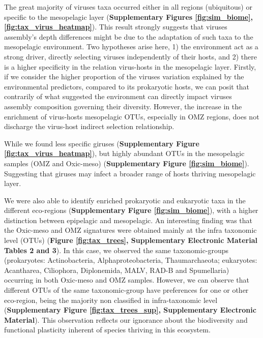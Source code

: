 \documentclass[fleqn,10pt]{wlscirep}
\begin{document}
The great majority of viruses taxa occurred either in all regions (ubiquitous) or specific to the mesopelagic layer (\textbf{Supplementary Figures \ref{fig:sim_biome}, \ref{fig:tax_virus_heatmap}}). This result strongly suggests that viruses assembly's depth differences might be due to the adaptation of such taxa to the mesopelagic environment. Two hypotheses arise here, 1) the environment act as a strong driver, directly selecting viruses independently of their hosts, and 2) there is a higher specificity in the relation virus-hosts in the mesopelagic layer. Firstly, if we consider the higher proportion of the viruses variation explained by the environmental predictors, compared to its prokaryotic hosts, we can posit that contrarily of what suggested the environment can directly impact viruses assembly composition governing their diversity. However, the increase in the enrichment of virus-hosts mesopelagic OTUs, especially in OMZ regions, does not discharge the virus-host indirect selection relationship.

While we found less specific giruses (\textbf{Supplementary Figure \ref{fig:tax_virus_heatmap}}), but highly abundant OTUs in the mesopelagic samples (OMZ and Oxic-meso) (\textbf{Supplementary Figure \ref{fig:sim_biome}}). Suggesting that giruses may infect a broader range of hosts thriving mesopelagic layer.

We were also able to identify enriched prokaryotic and eukaryotic taxa in the different eco-regions (\textbf{Supplementary Figure \ref{fig:sim_biome}}), with a higher distinction between epipelagic and mesopelagic. An interesting finding was that the Oxic-meso and OMZ signatures were obtained mainly at the infra taxonomic level (OTUs) (\textbf{Figure \ref{fig:tax_trees}, Supplementary Electronic Material Tables 2 and 3}). In this case, we observed the same taxonomic-groups (prokaryotes: Actinobacteria, Alphaproteobacteria, Thaumarchaeota; eukaryotes: Acantharea, Ciliophora, Diplonemida, MALV, RAD-B and Spumellaria) occurring in both Oxic-meso and OMZ samples. However, we can observe that different OTUs of the same taxonomic-group have preferences for one or other eco-region, being the majority non classified in infra-taxonomic level (\textbf{Supplementary Figure \ref{fig:tax_trees_sup}, Supplementary Electronic Material}). This observation reflects our ignorance about the biodiversity and functional plasticity inherent of species thriving in this ecosystem.
\end{document}
